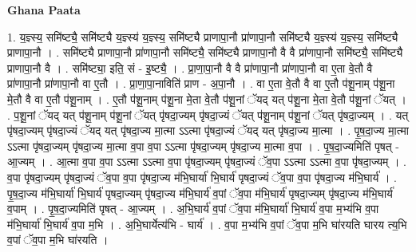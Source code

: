 \documentclass[17pt]{extarticle}
\begin{document}
\textbf{Ghana Paata } \newline

1. य॒ज्ञ्स्य॒ समि॑ष्ट्यै॒ समि॑ष्ट्यै य॒ज्ञ्स्य॑ य॒ज्ञ्स्य॒ समि॑ष्ट्यै प्राणापा॒नौ प्रा॑णापा॒नौ समि॑ष्ट्यै य॒ज्ञ्स्य॑ य॒ज्ञ्स्य॒ समि॑ष्ट्यै प्राणापा॒नौ । . समि॑ष्ट्यै प्राणापा॒नौ प्रा॑णापा॒नौ समि॑ष्ट्यै॒ समि॑ष्ट्यै प्राणापा॒नौ वै वै प्रा॑णापा॒नौ समि॑ष्ट्यै॒ समि॑ष्ट्यै प्राणापा॒नौ वै । . समि॑ष्ट्या॒ इति॒ सं - इ॒ष्ट्यै॒ । . प्रा॒णा॒पा॒नौ वै वै प्रा॑णापा॒नौ प्रा॑णापा॒नौ वा ए॒ता वे॒तौ वै प्रा॑णापा॒नौ प्रा॑णापा॒नौ वा ए॒तौ । . प्रा॒णा॒पा॒नाविति॑ प्राण - अ॒पा॒नौ । . वा ए॒ता वे॒तौ वै वा ए॒तौ प॑शू॒नाम् प॑शू॒ना मे॒तौ वै वा ए॒तौ प॑शू॒नाम् । . ए॒तौ प॑शू॒नाम् प॑शू॒ना मे॒ता वे॒तौ प॑शू॒नां ॅयद् यत् प॑शू॒ना मे॒ता वे॒तौ प॑शू॒नां ॅयत् । . प॒शू॒नां ॅयद् यत् प॑शू॒नाम् प॑शू॒नां ॅयत् पृ॑षदा॒ज्यम् पृ॑षदा॒ज्यं ॅयत् प॑शू॒नाम् प॑शू॒नां ॅयत् पृ॑षदा॒ज्यम् । . यत् पृ॑षदा॒ज्यम् पृ॑षदा॒ज्यं ॅयद् यत् पृ॑षदा॒ज्य मा॒त्मा ऽऽत्मा पृ॑षदा॒ज्यं ॅयद् यत् पृ॑षदा॒ज्य मा॒त्मा । . पृ॒ष॒दा॒ज्य मा॒त्मा ऽऽत्मा पृ॑षदा॒ज्यम् पृ॑षदा॒ज्य मा॒त्मा व॒पा व॒पा ऽऽत्मा पृ॑षदा॒ज्यम् पृ॑षदा॒ज्य मा॒त्मा व॒पा । . पृ॒ष॒दा॒ज्यमिति॑ पृषत् - आ॒ज्यम् । . आ॒त्मा व॒पा व॒पा ऽऽत्मा ऽऽत्मा व॒पा पृ॑षदा॒ज्यम् पृ॑षदा॒ज्यं ॅव॒पा ऽऽत्मा ऽऽत्मा व॒पा पृ॑षदा॒ज्यम् । . व॒पा पृ॑षदा॒ज्यम् पृ॑षदा॒ज्यं ॅव॒पा व॒पा पृ॑षदा॒ज्य म॑भि॒घार्या॑ भि॒घार्य॑ पृषदा॒ज्यं ॅव॒पा व॒पा पृ॑षदा॒ज्य म॑भि॒घार्य॑ । . पृ॒ष॒दा॒ज्य म॑भि॒घार्या॑ भि॒घार्य॑ पृषदा॒ज्यम् पृ॑षदा॒ज्य म॑भि॒घार्य॑ व॒पां ॅव॒पा म॑भि॒घार्य॑ पृषदा॒ज्यम् पृ॑षदा॒ज्य म॑भि॒घार्य॑ व॒पाम् । . पृ॒ष॒दा॒ज्यमिति॑ पृषत् - आ॒ज्यम् । . अ॒भि॒घार्य॑ व॒पां ॅव॒पा म॑भि॒घार्या॑ भि॒घार्य॑ व॒पा म॒भ्य॑भि व॒पा म॑भि॒घार्या॑ भि॒घार्य॑ व॒पा म॒भि । . अ॒भि॒घार्येत्य॑भि - घार्य॑ । . व॒पा म॒भ्य॑भि व॒पां ॅव॒पा म॒भि घा॑रयति घारय त्य॒भि व॒पां ॅव॒पा म॒भि घा॑रयति । \newline
\end{document}
